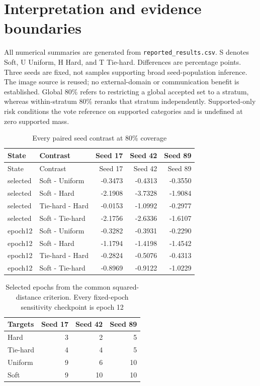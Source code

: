 \documentclass[10pt]{article}
\begin{document}
\section*{Interpretation and evidence boundaries}
All numerical summaries are generated from \texttt{reported\_results.csv}.
S denotes Soft, U Uniform, H Hard, and T Tie-hard. Differences are percentage points.
Three seeds are fixed, not samples supporting broad seed-population inference.
The image source is reused; no external-domain or communication benefit is established.
Global 80\% refers to restricting a global accepted set to a stratum, whereas within-stratum 80\% reranks that stratum independently.
Supported-only risk conditions the vote reference on supported categories and is undefined at zero supported mass.
\begin{longtable}{llrrr}
\caption{Every paired seed contrast at 80\% coverage}\label{tab:seeds}\\
\toprule State & Contrast & Seed 17 & Seed 42 & Seed 89\\\midrule\endfirsthead
\toprule State & Contrast & Seed 17 & Seed 42 & Seed 89\\\midrule\endhead
selected & Soft - Uniform & -0.3473 & -0.4313 & -0.3550\\
selected & Soft - Hard & -2.1908 & -3.7328 & -1.9084\\
selected & Tie-hard - Hard & -0.0153 & -1.0992 & -0.2977\\
selected & Soft - Tie-hard & -2.1756 & -2.6336 & -1.6107\\
epoch12 & Soft - Uniform & -0.3282 & -0.3931 & -0.2290\\
epoch12 & Soft - Hard & -1.1794 & -1.4198 & -1.4542\\
epoch12 & Tie-hard - Hard & -0.2824 & -0.5076 & -0.4313\\
epoch12 & Soft - Tie-hard & -0.8969 & -0.9122 & -1.0229\\
\bottomrule\end{longtable}
\begin{table}[ht]
\caption{Selected epochs from the common squared-distance criterion. Every fixed-epoch sensitivity checkpoint is epoch 12}
\centering\begin{tabular}{lrrr}\toprule
Targets & Seed 17 & Seed 42 & Seed 89\\\midrule
Hard & 3 & 2 & 5\\
Tie-hard & 4 & 4 & 5\\
Uniform & 9 & 6 & 10\\
Soft & 9 & 10 & 10\\
\bottomrule\end{tabular}\end{table}
\end{document}
